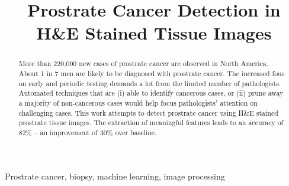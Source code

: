 \documentclass{article}
\title{Prostrate Cancer Detection in H\&E Stained Tissue Images}
\begin{document}
%
\maketitle
%
\begin{abstract}
More than 220,000 new cases of prostrate cancer are observed in North America. About 1 in 7 men are likely to be diagnosed with prostrate cancer. The increased fous on early and periodic testing demands a lot from the limited number of pathologists. Automated techniques that are (i) able to identify cancerous cases, or (ii) prune away a majority of non-cancerous cases would help focus pathologists' attention on challenging cases. This work attempts to detect prostrate cancer using H\&E stained prostrate tissue images. The extraction of meaningful features leads to an accuracy of 82\% -- an improvement of 30\% over baseline.
\end{abstract}
%
\begin{keywords}
Prostrate cancer, biopsy, machine learning, image processing
\end{keywords}
%














\end{document}
